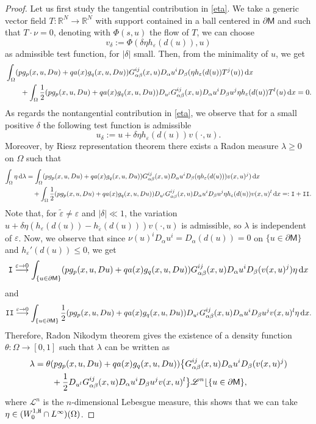 \documentclass[a4paper]{amsart}
\theoremstyle{plain}  %
\numberwithin{equation}{section}
\def\dx{\,{\rm d}x}
\def \d{\,{\rm d}}
\newcommand{\R}{\mathbb{R}}
\newcommand{\mm}{\mathsf{M}}
\newcommand{\tx}[1]{\textnormal{\texttt{#1}}}
\begin{document}
\begin{proof}
Let us first study the tangential contribution in \eqref{eta}. We take a generic vector field $ T : \R^N \to \R^N$ with support contained in a ball centered in $\partial \mm$ and such that $T \cdot \nu =0$, denoting with $\Phi(s,u)$ the flow of $T$, we can choose $$v_\delta := \Phi(\delta\eta h_\varepsilon(d(u)),u)$$ as admissible test function, for  $|\delta|$ small. Then, from the minimality of $u$, we get
\begin{align} \label{eq2}
    & \int_\Omega (pg_p(x,u,Du) + qa(x)g_q(x,u,Du))G^{ij}_{\alpha  \beta}(x,u)D_\alpha  u^i D_\beta (\eta h_\varepsilon (d(u))T^j(u)) \dx \notag \\ & \qquad + \int_{\Omega} \frac{1}{2} (pg_p(x,u,Du) + qa(x)g_q(x,u,Du)) D_{u^l} G^{ij}_{\alpha \beta} (x,u) D_\alpha u^i D_\beta u^j \eta h_\varepsilon (d(u)) T^l(u) \dx =0.
\end{align}
As regards the nontangential contribution in \eqref{eta}, we observe that for a small positive $\delta$ the following test function  is admissible
$$ u_\delta := u + \delta\eta h_\varepsilon(d(u))v(\cdot,u).$$
Moreover, by Riesz representation theorem there exists a Radon measure $\lambda  \geq 0$ on $\Omega$ such that
\begin{align} \label{eq1}
    \int_\Omega  \eta \d\lambda &= \int_{\Omega} (p g_p(x,u,Du)+ qa(x) g_q(x,u,Du)) G^{ij}_{\alpha \beta}(x,u)D_{\alpha}u^i D_\beta(\eta h_\varepsilon(d(u)))v(x,u)^j) \dx  \notag \\ & \quad + \int_{\Omega}\frac{1}{2}(p g_p(x,u,Du)+ qa(x) g_q(x,u,Du))D_{u^l} G^{ij}_{\alpha \beta} (x,u)D_\alpha u^i D_\beta u^j \eta h_\varepsilon (d(u)) v(x,u)^l \dx =: \tx{I} + \tx{II}.
\end{align}
Note that, for $\tilde{\varepsilon} \neq \varepsilon$ and $|\delta| \ll 1$, the variation $u+\delta\eta(h_\varepsilon (d(u))- h_{\tilde{\varepsilon}}(d(u)))v(\cdot,u)$ is  admissible,  so $\lambda$  is independent of $\varepsilon$. Now, we  observe that since $\nu(u)^i D_\alpha u^i = D_\alpha (d(u)) =0$ on $\{ u \in \partial \mm \}$ and $h_\varepsilon '(d(u)) \leq 0$, we get
$$ \tx{I} \overset{\varepsilon \to 0}{\longrightarrow} \int_{\{ u \in \partial \mm \}} (pg_p(x,u,Du)+qa(x)g_q(x,u,Du)) G^{ij}_{\alpha \beta}(x,u) D_\alpha u^i D_\beta (v(x,u)^j) \eta \dx$$
and
$$ \tx{II} \overset{\varepsilon \to 0}{\longrightarrow}  \int_{\{ u \in \partial \mm\} } \frac{1}{2}(pg_p(x,u,Du) + qa(x)g_q(x,u,Du)) D_{u^l}G^{ij}_{\alpha \beta}(x,u) D_\alpha u^i D_\beta u^j v(x,u)^l \eta \dx.$$
Therefore, Radon Nikodym theorem gives the existence of a density function $\theta: \Omega \to [0,1]$ such that $\lambda$ can be written as
\begin{align} \label{lambda}
    \lambda & =  \theta (pg_p(x,u,Du)+qa(x)g_q(x,u,Du)) \big \{ G^{ij}_{\alpha \beta} (x,u) D_\alpha u^i D_\beta (v(x,u)^j) \notag \\ & \qquad + \frac{1}{2}D_{u^l}G^{ij}_{\alpha \beta}(x,u)D_\alpha u^i D_\beta u^j v(x,u)^l \big \} \mathscr{L}^n \lfloor \{ u \in \partial \mm\},
\end{align}
where $\mathscr{L}^n$ is the $n$-dimensional Lebesgue measure, this shows that we can take $\eta \in (W^{1,\tx{H}}_0 \cap L^\infty)(\Omega)$.



\end{proof}
\end{document}
